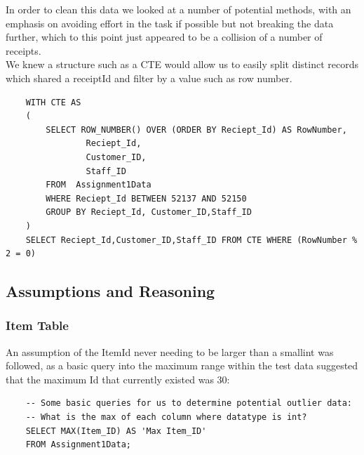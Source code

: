 \documentclass{article}
\newcounter{num}
\begin{document}
            In order to clean this data we looked at a number of potential methods, with an 
            emphasis on avoiding effort in the task if possible but not breaking the data further,
            which to this point just appeared to be a collision of a number of receipts.
            \\
            We knew a structure such as a CTE\cite{CTE} would allow us to easily split
            distinct records which shared a receiptId and filter by a value such as row number.
            \begin{verbatim}
    WITH CTE AS
    (
        SELECT ROW_NUMBER() OVER (ORDER BY Reciept_Id) AS RowNumber,
                Reciept_Id,
                Customer_ID,
                Staff_ID
        FROM  Assignment1Data
        WHERE Reciept_Id BETWEEN 52137 AND 52150
        GROUP BY Reciept_Id, Customer_ID,Staff_ID 
    )
    SELECT Reciept_Id,Customer_ID,Staff_ID FROM CTE WHERE (RowNumber % 2 = 0)
            \end{verbatim}

        \subsection{Assumptions and Reasoning}
            \subsubsection{Item Table}
                An assumption of the ItemId never needing to be larger than a smallint
                was followed, as a basic query into the maximum range within the test data
                suggested that the maximum Id that currently existed was 30:
                \begin{verbatim}
    -- Some basic queries for us to determine potential outlier data:
    -- What is the max of each column where datatype is int?
    SELECT MAX(Item_ID) AS 'Max Item_ID'
    FROM Assignment1Data;
                \end{verbatim}
\end{document}
